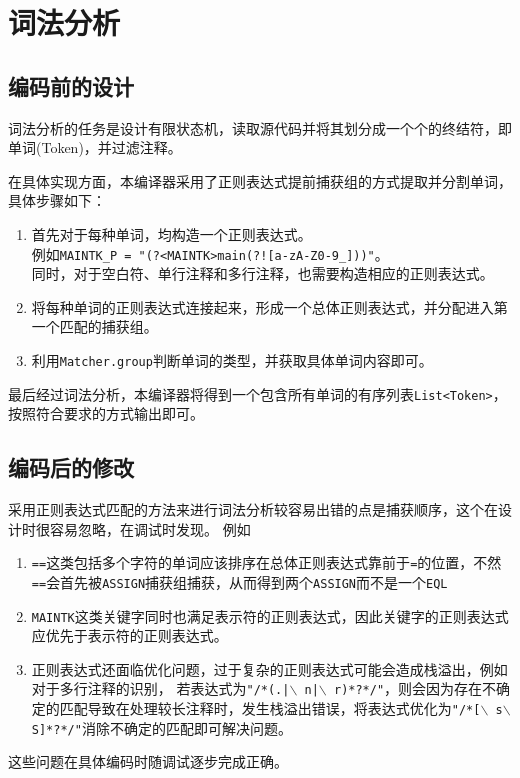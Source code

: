 \chapter{词法分析}
\section{编码前的设计}
    词法分析的任务是设计有限状态机，读取源代码并将其划分成一个个的终结符，即单词(Token)，并过滤注释。

    在具体实现方面，本编译器采用了正则表达式提前捕获组的方式提取并分割单词，具体步骤如下：
    \begin{enumerate}
        \item 首先对于每种单词，均构造一个正则表达式。\\例如\texttt{MAINTK\_P = "(?<MAINTK>main(?![a-zA-Z0-9\_]))"}。
            \\同时，对于空白符、单行注释和多行注释，也需要构造相应的正则表达式。
        \item 将每种单词的正则表达式连接起来，形成一个总体正则表达式，并分配进入第一个匹配的捕获组。
        \item 利用\texttt{Matcher.group}判断单词的类型，并获取具体单词内容即可。
    \end{enumerate}
    最后经过词法分析，本编译器将得到一个包含所有单词的有序列表\texttt{List<Token>}，按照符合要求的方式输出即可。
\section{编码后的修改}
    采用正则表达式匹配的方法来进行词法分析较容易出错的点是捕获顺序，这个在设计时很容易忽略，在调试时发现。
    例如
    \begin{enumerate}
        \item \texttt{==}这类包括多个字符的单词应该排序在总体正则表达式靠前于\texttt{=}的位置，不然\texttt{==}会首先被\texttt{ASSIGN}捕获组捕获，从而得到两个\texttt{ASSIGN}而不是一个\texttt{EQL}
        \item \texttt{MAINTK}这类关键字同时也满足表示符的正则表达式，因此关键字的正则表达式应优先于表示符的正则表达式。
        \item 正则表达式还面临优化问题，过于复杂的正则表达式可能会造成栈溢出，例如对于多行注释的识别，
        若表达式为\texttt{"/*(.|$\backslash$ n|$\backslash$ r)*?*/"}，则会因为存在不确定的匹配导致在处理较长注释时，发生栈溢出错误，将表达式优化为\texttt{"/*[$\backslash$ s$\backslash$ S]*?*/"}消除不确定的匹配即可解决问题。
    \end{enumerate}
    
    这些问题在具体编码时随调试逐步完成正确。